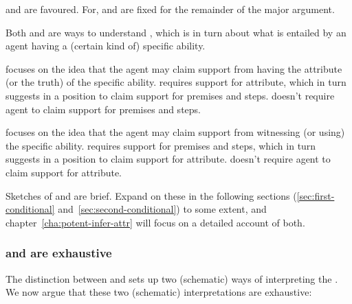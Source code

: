 \begin{note}
  \AR{} and \WR{} are favoured.
  For, \gsi{} and \aben{} are fixed for the remainder of the major argument.
\end{note}

\begin{note}
  Both \AR{} and \WR{} are ways to understand \aben{}, which is in turn about what is entailed by an agent having a (certain kind of) specific ability.

  \AR{} focuses on the idea that the agent may claim support from having the attribute (or the truth) of the specific ability.
  \AR{} requires support for attribute, which in turn suggests in a position to claim support for premises and steps.
  \AR{} doesn't require agent to claim support for premises and steps.

  \WR{} focuses on the idea that the agent may claim support from witnessing (or using) the specific ability.
  \WR{} requires support for premises and steps, which in turn suggests in a position to claim support for attribute.
  \WR{} doesn't require agent to claim support for attribute.
\end{note}

\begin{note}
  Sketches of \AR{} and \WR{} are brief.
  Expand on these in the following sections (\ref{sec:first-conditional} and~\ref{sec:second-conditional}) to some extent, and chapter~\ref{cha:potent-infer-attr} will focus on a detailed account of both.
\end{note}

\subsubsection{\AR{} and \WR{} are exhaustive}
\label{sec:ar-wr-are}

\begin{note}
  The distinction between \AR{} and \WR{} sets up two (schematic) ways of interpreting the \aben{}.
  We now argue that these two (schematic) interpretations are exhaustive:

\end{note}

